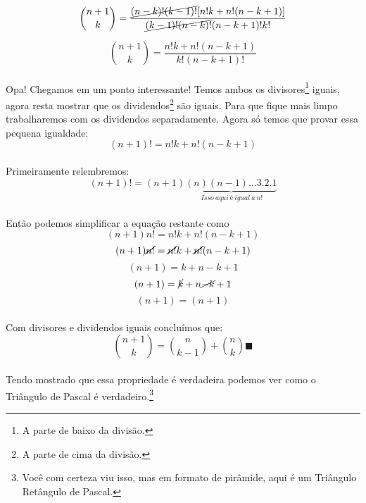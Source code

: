 \documentclass[main.tex]{subfiles}
\begin{document}
$${n+1 \choose k} = \frac{\cancel{(n-k)!(k-1)!}[n!k+n!(n-k+1)]}{\cancel{(k-1)!(n-k)!}(n-k+1)!k!}$$

$${n+1 \choose k} = \frac{n!k + n!(n-k+1)}{k!(n-k+1)!}$$
\\
Opa! Chegamos em um ponto interessante! Temos ambos os divisores\footnote{A parte de baixo da divisão.} iguais, agora resta mostrar que os dividendos\footnote{A parte de cima da divisão.} são iguais. Para que fique mais limpo trabalharemos com os dividendos separadamente. Agora só temos que provar essa pequena igualdade:
\\
$$ (n + 1)! = n!k + n!(n - k + 1) $$
\\
Primeiramente relembremos:
\\
$$ (n+1)! = (n+1)\underbrace{(n)(n-1)...3.2.1}_{ \ Isso \ aqui \ é \ igual \ a \ n!} $$
\\
Então podemos simplificar a equação restante como
\\
$$ (n+1)n! = n!k + n!(n-k+1) $$
$$ (n+1)\cancel{n!} = \cancel{n!}k + \cancel{n!}(n-k+1) $$
$$ (n+1) = k + n - k + 1 $$
$$ (n+1) = \cancel{k} + n\cancel{-k}+1 $$
$$ (n+1) = (n+1) $$
\\
Com divisores e dividendos iguais concluímos que:
$$ {n+1 \choose k} = {n \choose k-1} + {n \choose k} \blacksquare$$
\\
Tendo mostrado que essa propriedade é verdadeira podemos ver como o Triângulo de Pascal é verdadeiro.\footnote{Você com certeza viu isso, mas em formato de pirâmide, aqui é um Triângulo Retângulo de Pascal.}
\\
\end{document}
